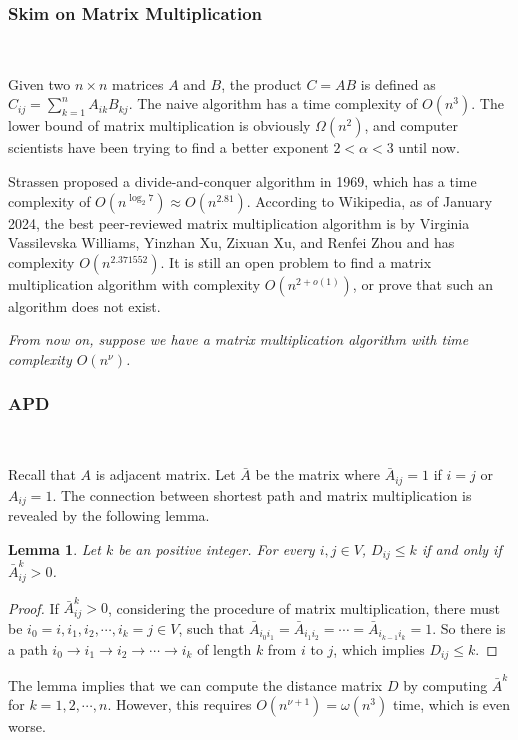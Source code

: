 \documentclass[12pt]{article}
\newtheorem{lemma}{Lemma}
\begin{document}
\subsubsection{Skim on Matrix Multiplication}\

Given two $n\times n$ matrices $A$ and $B$, the product $C=AB$ is defined as $C_{ij}=\sum_{k=1}^n A_{ik}B_{kj}$. The naive algorithm has a time complexity of $O(n^3)$. The lower bound of matrix multiplication is obviously $\Omega(n^2)$, and computer scientists have been trying to find a better exponent $2<\alpha<3$ until now.

Strassen proposed a divide-and-conquer algorithm in 1969, which has a time complexity of $O(n^{\log_2 7})\approx O(n^{2.81})$. According to Wikipedia, as of January 2024, the best peer-reviewed matrix multiplication algorithm is by Virginia Vassilevska Williams, Yinzhan Xu, Zixuan Xu, and Renfei Zhou and has complexity $O(n^{2.371552})$. It is still an open problem to find a matrix multiplication algorithm with complexity $O(n^{2+o(1)})$, or prove that such an algorithm does not exist.

\emph{From now on, suppose we have a matrix multiplication algorithm with time complexity $O(n^\nu)$.}

\subsubsection{APD}\

Recall that $A$ is adjacent matrix. Let $\bar{A}$ be the matrix where $\bar{A}_{ij}=1$ if $i=j$ or $A_{ij}=1$. The connection between shortest path and matrix multiplication is revealed by the following lemma.
\begin{lemma}
    \label{lemma:shortest_path_matrix_multiplication}
    Let $k$ be an positive integer. For every $i,j\in V$, $D_{ij}\le k$ if and only if $\bar{A}^k_{ij}>0$.
\end{lemma}
\begin{proof}
If $\bar{A}^k_{ij}>0$, considering the procedure of matrix multiplication, there must be $i_0=i,i_1,i_2,\cdots,i_k=j\in V$, such that $\bar A_{i_0i_1}=\bar A_{i_1i_2}=\cdots=\bar A_{i_{k-1}i_k}=1$. So there is a path $i_0\to i_1\to i_2\to\cdots\to i_k$ of length $k$ from $i$ to $j$, which implies $D_{ij}\le k$.
\end{proof}

The lemma implies that we can compute the distance matrix $D$ by computing $\bar{A}^k$ for $k=1,2,\cdots,n$. However, this requires $O(n^{\nu+1})=\omega(n^3)$ time, which is even worse.
\end{document}
